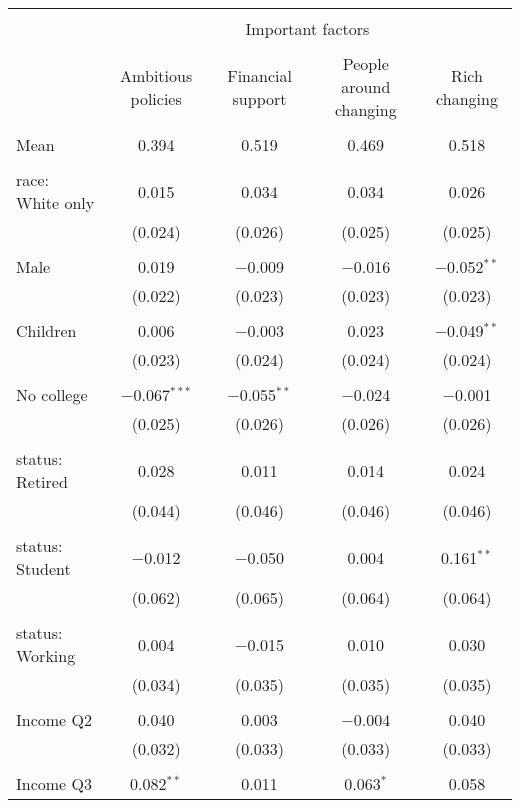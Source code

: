
\begin{tabular}{@{\extracolsep{5pt}}lcccc} 
\\[-1.8ex]\hline 
\hline \\[-1.8ex] 
 & \multicolumn{4}{c}{Important factors} \\ 
\cline{2-5} 
\\[-1.8ex] & Ambitious policies & Financial support & People around changing & Rich changing \\ 
\hline \\[-1.8ex] 
 Mean & 0.394 & 0.519 & 0.469 & 0.518  \\ \hline \\[-1.8ex] race: White only & 0.015 & 0.034 & 0.034 & 0.026 \\ 
  & (0.024) & (0.026) & (0.025) & (0.025) \\ 
  & & & & \\ 
 Male & 0.019 & $-$0.009 & $-$0.016 & $-$0.052$^{**}$ \\ 
  & (0.022) & (0.023) & (0.023) & (0.023) \\ 
  & & & & \\ 
 Children & 0.006 & $-$0.003 & 0.023 & $-$0.049$^{**}$ \\ 
  & (0.023) & (0.024) & (0.024) & (0.024) \\ 
  & & & & \\ 
 No college & $-$0.067$^{***}$ & $-$0.055$^{**}$ & $-$0.024 & $-$0.001 \\ 
  & (0.025) & (0.026) & (0.026) & (0.026) \\ 
  & & & & \\ 
 status: Retired & 0.028 & 0.011 & 0.014 & 0.024 \\ 
  & (0.044) & (0.046) & (0.046) & (0.046) \\ 
  & & & & \\ 
 status: Student & $-$0.012 & $-$0.050 & 0.004 & 0.161$^{**}$ \\ 
  & (0.062) & (0.065) & (0.064) & (0.064) \\ 
  & & & & \\ 
 status: Working & 0.004 & $-$0.015 & 0.010 & 0.030 \\ 
  & (0.034) & (0.035) & (0.035) & (0.035) \\ 
  & & & & \\ 
 Income Q2 & 0.040 & 0.003 & $-$0.004 & 0.040 \\ 
  & (0.032) & (0.033) & (0.033) & (0.033) \\ 
  & & & & \\ 
 Income Q3 & 0.082$^{**}$ & 0.011 & 0.063$^{*}$ & 0.058 \\ 

\end{tabular}
